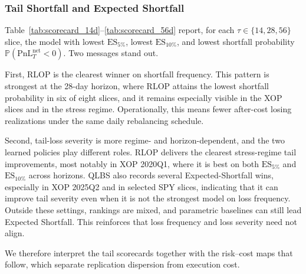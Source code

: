 \subsubsection{Tail Shortfall and Expected Shortfall}
\label{subsubsec:tail_es}

Table~\ref{tab:scorecard_14d}--\ref{tab:scorecard_56d} report, for each $\tau\in\{14,28,56\}$ slice, the model with lowest $\mathrm{ES}_{5\%}$, lowest $\mathrm{ES}_{10\%}$, and lowest shortfall probability $\mathbb{P}(\mathrm{PnL}_T^{\mathrm{net}}<0)$. Two messages stand out.

First, RLOP is the clearest winner on shortfall frequency. This pattern is strongest at the 28-day horizon, where RLOP attains the lowest shortfall probability in six of eight slices, and it remains especially visible in the XOP slices and in the stress regime. Operationally, this means fewer after-cost losing realizations under the same daily rebalancing schedule.

Second, tail-loss severity is more regime- and horizon-dependent, and the two learned policies play different roles. RLOP delivers the clearest stress-regime tail improvements, most notably in XOP 2020Q1, where it is best on both $\mathrm{ES}_{5\%}$ and $\mathrm{ES}_{10\%}$ across horizons. QLBS also records several Expected-Shortfall wins, especially in XOP 2025Q2 and in selected SPY slices, indicating that it can improve tail severity even when it is not the strongest model on loss frequency. Outside these settings, rankings are mixed, and parametric baselines can still lead Expected Shortfall. This reinforces that loss frequency and loss severity need not align.

We therefore interpret the tail scorecards together with the risk--cost maps that follow, which separate replication dispersion from execution cost.


